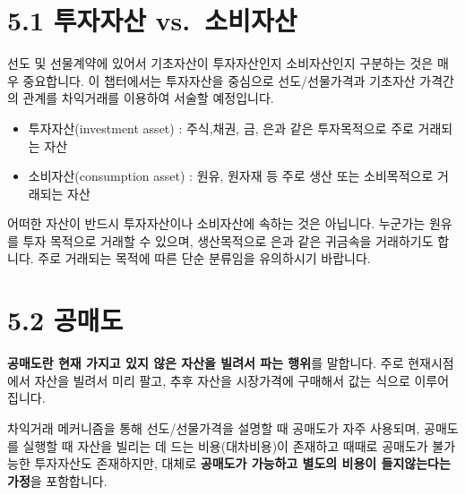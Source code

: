 \documentclass[
  letterpaper,
  DIV=11,
  numbers=noendperiod]{scrreprt}
\begin{document}
\section*{5.1 투자자산
vs.~소비자산}\label{uxd22cuxc790uxc790uxc0b0-vs.-uxc18cuxbe44uxc790uxc0b0}


선도 및 선물계약에 있어서 기초자산이 투자자산인지 소비자산인지 구분하는
것은 매우 중요합니다. 이 챕터에서는 투자자산을 중심으로 선도/선물가격과
기초자산 가격간의 관계를 차익거래를 이용하여 서술할 예정입니다.

\begin{itemize}
\item
  투자자산(investment asset) : 주식,채권, 금, 은과 같은 투자목적으로
  주로 거래되는 자산
\item
  소비자산(consumption asset) : 원유, 원자재 등 주로 생산 또는
  소비목적으로 거래되는 자산
\end{itemize}

\begin{tcolorbox}[enhanced jigsaw, toprule=.15mm, breakable, left=2mm, leftrule=.75mm, opacitybacktitle=0.6, coltitle=black, rightrule=.15mm, colback=white, titlerule=0mm, bottomtitle=1mm, colframe=quarto-callout-note-color-frame, title=\textcolor{quarto-callout-note-color}{\faInfo}\hspace{0.5em}{Note}, toptitle=1mm, arc=.35mm, colbacktitle=quarto-callout-note-color!10!white, opacityback=0, bottomrule=.15mm]

어떠한 자산이 반드시 투자자산이나 소비자산에 속하는 것은 아닙니다.
누군가는 원유를 투자 목적으로 거래할 수 있으며, 생산목적으로 은과 같은
귀금속을 거래하기도 합니다. 주로 거래되는 목적에 따른 단순 분류임을
유의하시기 바랍니다.

\end{tcolorbox}

\section*{5.2 공매도}\label{uxacf5uxb9e4uxb3c4}


\textbf{공매도란 현재 가지고 있지 않은 자산을 빌려서 파는 행위}를
말합니다. 주로 현재시점에서 자산을 빌려서 미리 팔고, 추후 자산을
시장가격에 구매해서 값는 식으로 이루어집니다.

차익거래 메커니즘을 통해 선도/선물가격을 설명할 때 공매도가 자주
사용되며, 공매도를 실행할 때 자산을 빌리는 데 드는 비용(대차비용)이
존재하고 때때로 공매도가 불가능한 투자자산도 존재하지만, 대체로
\textbf{공매도가 가능하고 별도의 비용이 들지않는다는 가정}을 포함합니다.
\end{document}
